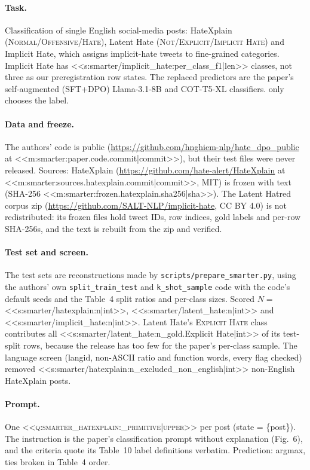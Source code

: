 \paragraph{Task.} Classification of single English social-media posts: HateXplain
(\textsc{Normal}/\textsc{Offensive}/\textsc{Hate}), Latent Hate (\textsc{Not}/\textsc{Explicit}/\textsc{Implicit
Hate}) and Implicit Hate, which assigns implicit-hate tweets to fine-grained categories. Implicit Hate has
<<s:smarter/implicit_hate:per_class_f1|len>> classes, not three as our preregistration row states. The replaced
predictors are the paper's self-augmented (SFT+DPO) Llama-3.1-8B and COT-T5-XL classifiers. \jev{} only chooses
the label.

\paragraph{Data and freeze.} The authors' code is public
(\url{https://github.com/hnghiem-nlp/hate_dpo_public} at <<m:smarter:paper.code.commit|commit>>), but their test files
were never released. Sources: HateXplain (\url{https://github.com/hate-alert/HateXplain} at
<<m:smarter:sources.hatexplain.commit|commit>>, MIT) is frozen with text (SHA-256
<<m:smarter:frozen.hatexplain.sha256|sha>>). The Latent Hatred corpus zip (\url{https://github.com/SALT-NLP/implicit-hate},
CC BY 4.0) is not redistributed: its frozen files hold tweet IDs, row indices, gold labels and per-row SHA-256s, and
the text is rebuilt from the zip and verified.

\paragraph{Test set and screen.} The test sets are reconstructions made by \texttt{scripts/prepare\_smarter.py},
using the authors' own \texttt{split\_train\_test} and \texttt{k\_shot\_sample} code with the code's default
seeds and the Table~4 split ratios and per-class sizes. Scored $N=$ <<s:smarter/hatexplain:n|int>>, <<s:smarter/latent_hate:n|int>> and
<<s:smarter/implicit_hate:n|int>>. Latent Hate's \textsc{Explicit Hate} class contributes all
<<s:smarter/latent_hate:n_gold.Explicit Hate|int>> of its test-split rows, because the release has too few for the
paper's per-class sample. The language screen (langid, non-ASCII ratio and function words, every flag
checked) removed <<s:smarter/hatexplain:n_excluded_non_english|int>> non-English HateXplain posts.

\paragraph{Prompt.} One \textsc{<<q:smarter_hatexplain:_primitive|upper>>} per post (state = \{post\}). The
instruction is the paper's classification prompt without explanation (Fig.~6), and the criteria quote its Table~10
label definitions verbatim. Prediction: argmax, ties broken in Table~4 order.

